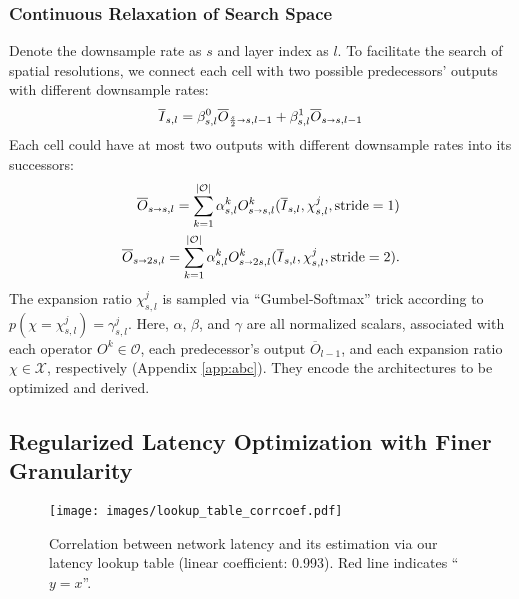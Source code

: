 \documentclass{article} \usepackage{iclr2020_conference,times}
\begin{document}
\subsubsection{Continuous Relaxation of Search Space}\label{sec:differentiable_space}\vspace{-0.5em}
Denote the downsample rate as $s$ and layer index as $l$. To facilitate the search of spatial resolutions, we connect each cell with two possible predecessors' outputs with different downsample rates:\vspace{-0.3em}
\begin{equation}
    \overline{I}_{s, l} = \beta^0_{s, l}\overline{O}_{\frac{s}{2}\shortrightarrow s, l-1} + \beta^1_{s, l}\overline{O}_{s\shortrightarrow s, l-1}
    \label{eq:cell_input}
\end{equation}
Each cell could have at most two outputs with different downsample rates into its successors:\vspace{-0.4em}
\begin{equation}
\begin{split}
\vspace{-0.5em}
    \overline{O}_{s\shortrightarrow s, l} = \sum_{k=1}^{|\mathcal{O}|}\alpha^k_{s, l}O^k_{s\shortrightarrow s, l}(\overline{I}_{s, l}, \chi^j_{s, l}, \mathrm{stride}=1) \\ 
    \overline{O}_{s\shortrightarrow 2s, l} = \sum_{k=1}^{|\mathcal{O}|}\alpha^k_{s, l}O^k_{s\shortrightarrow 2s, l}(\overline{I}_{s, l}, \chi^j_{s, l}, \mathrm{stride}=2).
\end{split}
\label{eq:cell_output}
\end{equation}
The expansion ratio $\chi^j_{s, l}$ is sampled via ``Gumbel-Softmax'' trick according to $p(\chi=\chi^j_{s, l}) = \gamma^j_{s, l}$. Here, $\alpha$, $\beta$, and $\gamma$ are all normalized scalars, associated with each operator $O^k \in \mathcal{O}$, each predecessor's output $\overline{O}_{l-1}$, and each expansion ratio $\chi \in \mathcal{X}$, respectively (Appendix \ref{app:abc}). They encode the architectures to be optimized and derived.\vspace{-1em}


\subsection{Regularized Latency Optimization with Finer Granularity}

\begin{wrapfigure}{r}{50mm}
\vspace{-3.2em}
\begin{center}
\texttt{[image: images/lookup\_table\_corrcoef.pdf]}
\end{center}
\vspace{-1.5em}
\caption{Correlation between network latency and its estimation via our latency lookup table (linear coefficient: 0.993). Red line indicates ``$y = x$''.}
\vspace{-1em}
\label{fig:lookup_table}
\end{wrapfigure}
\end{document}
